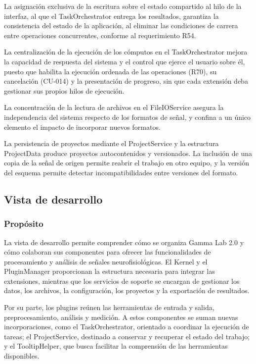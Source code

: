 \documentclass[11pt,a4paper]{article}
\DeclareRobustCommand{\_}{\textunderscore\allowbreak}
\begin{document}
La asignación exclusiva de la escritura sobre el estado compartido al hilo de la interfaz, al que el TaskOrchestrator entrega los resultados, garantiza la consistencia del estado de la aplicación, al eliminar las condiciones de carrera entre operaciones concurrentes, conforme al requerimiento R54.

La centralización de la ejecución de los cómputos en el TaskOrchestrator mejora la capacidad de respuesta del sistema y el control que ejerce el usuario sobre él, puesto que habilita la ejecución ordenada de las operaciones (R70), su cancelación (CU-014) y la presentación de progreso, sin que cada extensión deba gestionar sus propios hilos de ejecución.

La concentración de la lectura de archivos en el FileIOService asegura la independencia del sistema respecto de los formatos de señal, y confina a un único elemento el impacto de incorporar nuevos formatos.

La persistencia de proyectos mediante el ProjectService y la estructura ProjectData produce proyectos autocontenidos y versionados. La inclusión de una copia de la señal de origen permite reabrir el trabajo en otro equipo, y la versión del esquema permite detectar incompatibilidades entre versiones del formato.

\subsection{Vista de desarrollo}
\subsubsection{Propósito}
La vista de desarrollo permite comprender cómo se organiza Gamma Lab 2.0 y cómo colaboran sus componentes para ofrecer las funcionalidades de procesamiento y análisis de señales neurofisiológicas. El Kernel y el PluginManager proporcionan la estructura necesaria para integrar las extensiones, mientras que los servicios de soporte se encargan de gestionar los datos, los archivos, la configuración, los proyectos y la exportación de resultados.

Por su parte, los plugins reúnen las herramientas de entrada y salida, preprocesamiento, análisis y medición. A estos componentes se suman nuevas incorporaciones, como el TaskOrchestrator, orientado a coordinar la ejecución de tareas; el ProjectService, destinado a conservar y recuperar el estado del trabajo; y el TooltipHelper, que busca facilitar la comprensión de las herramientas disponibles.
\end{document}
